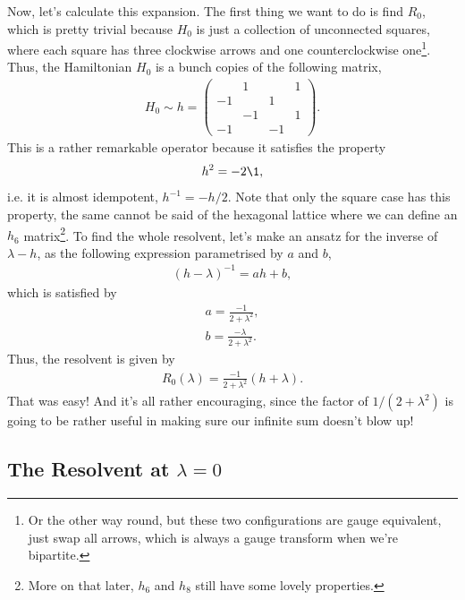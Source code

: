 \documentclass[11pt, oneside]{article} %
\numberwithin{equation}{section}
\begin{document}
Now, let's calculate this expansion. The first thing we want to do is find $R_0$, which is pretty trivial because $H_0$ is just a collection of unconnected squares, where each square has three clockwise arrows and one counterclockwise one\footnote{Or the other way round, but these two configurations are gauge equivalent, just swap all arrows, which is always a gauge transform when we're bipartite.}. Thus, the Hamiltonian $H_0$ is a bunch copies of the following matrix,
\begin{align}
    H_0 \sim h = \begin{pmatrix}
         & 1 &  & 1 \\
        -1 &  & 1 &  \\
         & -1 &  & 1 \\
        -1 &  & -1 &  
    \end{pmatrix}.
\end{align}
This is a rather remarkable operator because it satisfies the property
\begin{align}
    h^2  = -2 \1,
\end{align}
i.e. it is almost idempotent, $h^{-1} = -h/2$. Note that only the square case has this property, the same cannot be said of the hexagonal lattice where we can define an $h_6$ matrix\footnote{More on that later, $h_6$ and $h_8$ still have some lovely properties.}. To find the whole resolvent, let's make an ansatz for the inverse of $\lambda - h$, as the following expression parametrised by $a$ and $b$,
\begin{align}
    \left (
         h- \lambda
    \right )^{-1} = 
        ah + b,
\end{align}
which is satisfied by
\begin{align}
    a = \frac{-1}{2 + \lambda^2}, \\
    b = \frac{-\lambda}{2 + \lambda^2}.
\end{align}
Thus, the resolvent is given by 
\begin{align}
    R_0(\lambda) = \frac{-1}{2+\lambda^2}\left ( 
        h+\lambda 
    \right ).
\end{align}
That was easy! And it's all rather encouraging, since the factor of $1/(2+\lambda^2)$ is going to be rather useful in making sure our infinite sum doesn't blow up!

\subsection{The Resolvent at $\lambda = 0$}
\end{document}

